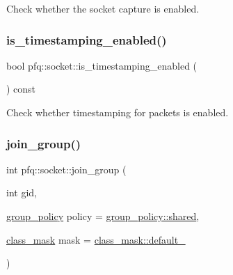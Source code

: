 Check whether the socket capture is enabled. 

\mbox{\label{classpfq_1_1socket_acb406c77d80eddec6acce34b934a8309}} 
\subsubsection{\texorpdfstring{is\+\_\+timestamping\+\_\+enabled()}{is\_timestamping\_enabled()}}
{\footnotesize\ttfamily bool pfq\+::socket\+::is\+\_\+timestamping\+\_\+enabled (\begin{DoxyParamCaption}{ }\end{DoxyParamCaption}) const\hspace{0.3cm}{\ttfamily [inline]}}



Check whether timestamping for packets is enabled. 

\mbox{\label{classpfq_1_1socket_a118d0b045183cd226387e3851696c50f}} 
\subsubsection{\texorpdfstring{join\+\_\+group()}{join\_group()}}
{\footnotesize\ttfamily int pfq\+::socket\+::join\+\_\+group (\begin{DoxyParamCaption}\item[{int}]{gid,  }\item[{\hyperlink{namespacepfq_ac41249c8510558905b01fa4d866a38d7}{group\+\_\+policy}}]{policy = {\ttfamily \hyperlink{namespacepfq_ac41249c8510558905b01fa4d866a38d7a9e81e7b963c71363e2fb3eefcfecfc0e}{group\+\_\+policy\+::shared}},  }\item[{\hyperlink{namespacepfq_a96af1f5ed530eff563eb917516758fbb}{class\+\_\+mask}}]{mask = {\ttfamily \hyperlink{namespacepfq_a96af1f5ed530eff563eb917516758fbba172b03053216c6158fe380805998ad6c}{class\+\_\+mask\+::default\+\_\+}} }\end{DoxyParamCaption})\hspace{0.3cm}{\ttfamily [inline]}}



